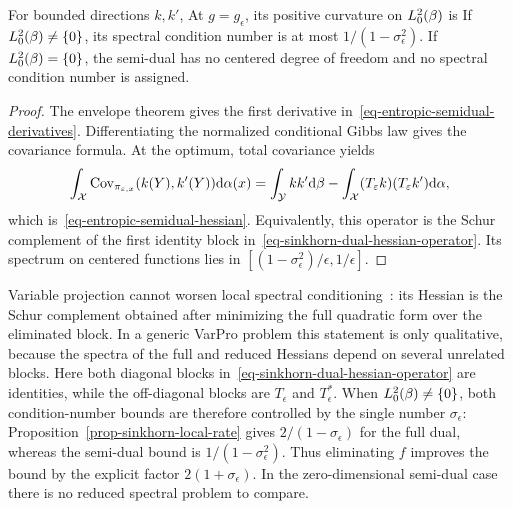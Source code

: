 \begin{prop}\label{prop-sinkhorn-semidual-curvature}
	For bounded directions $k,k'$,
	At $g=g_\epsilon$, its positive curvature on $L_0^2(\beta)$ is
	If $L_0^2(\beta)\neq\{0\}$, its spectral condition number is at most
	\(
		1/(1-\sigma_\epsilon^2)
	\). If $L_0^2(\beta)=\{0\}$, the semi-dual has no centered degree of freedom and no spectral condition number is assigned.
\end{prop}

\begin{proof}
	The envelope theorem gives the first derivative in~\eqref{eq-entropic-semidual-derivatives}. Differentiating the normalized conditional Gibbs law gives the covariance formula. At the optimum, total covariance yields
	\[
		\int_{\mathcal{X}}
		\operatorname{Cov}_{\pi_{\varepsilon,x}}(k(Y),k'(Y))
		\mathrm{d}\alpha(x)
		=
		\int_{\mathcal{Y}} kk'\mathrm{d}\beta
		-
		\int_{\mathcal{X}}(T_\varepsilon k)(T_\varepsilon k')\mathrm{d}\alpha,
	\]
	which is~\eqref{eq-entropic-semidual-hessian}. Equivalently, this operator is the Schur complement of the first identity block in~\eqref{eq-sinkhorn-dual-hessian-operator}. Its spectrum on centered functions lies in
	\(
		[(1-\sigma_\epsilon^2)/\epsilon,1/\epsilon]
	\).
\end{proof}

Variable projection cannot worsen local spectral conditioning~\cite{golub1973variableprojection,golub2003variableprojection}: its Hessian is the Schur complement obtained after minimizing the full quadratic form over the eliminated block. In a generic VarPro problem this statement is only qualitative, because the spectra of the full and reduced Hessians depend on several unrelated blocks. Here both diagonal blocks in~\eqref{eq-sinkhorn-dual-hessian-operator} are identities, while the off-diagonal blocks are $T_\epsilon$ and $T_\epsilon^*$. When $L_0^2(\beta)\neq\{0\}$, both condition-number bounds are therefore controlled by the single number $\sigma_\epsilon$: Proposition~\ref{prop-sinkhorn-local-rate} gives $2/(1-\sigma_\epsilon)$ for the full dual, whereas the semi-dual bound is $1/(1-\sigma_\epsilon^2)$. Thus eliminating $f$ improves the bound by the explicit factor $2(1+\sigma_\epsilon)$. In the zero-dimensional semi-dual case there is no reduced spectral problem to compare.

